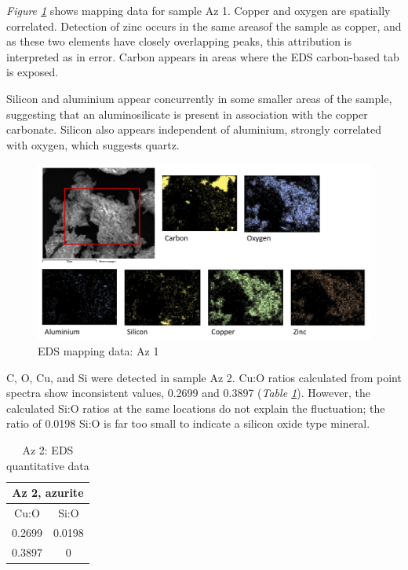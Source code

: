 \textit{Figure \ref{fig:az1_map1}} shows mapping data for sample Az 1. Copper and oxygen are spatially correlated. Detection of zinc occurs in the same areasof the sample as copper, and as these two elements have closely overlapping peaks, this attribution is interpreted as in error. Carbon appears in areas where the EDS carbon-based tab is exposed.

Silicon and aluminium appear concurrently in some smaller areas of the sample, suggesting that an aluminosilicate is present in association with the copper carbonate. Silicon also appears independent of aluminium, strongly correlated with oxygen, which suggests quartz. 

\begin{figure}[H]
\centering
  \includegraphics[width=0.9\linewidth]{Az1_EDS_map2_250221_img}
\caption[EDS mapping data: Az 1]{EDS mapping data: Az 1}
\label{fig:az1_map1}
\end{figure}



C, O, Cu, and Si were detected in sample Az 2. Cu:O ratios calculated from point spectra show inconsistent values, 0.2699 and 0.3897 (\textit{Table \ref{table:az2_ratios}}). However, the calculated Si:O ratios at the same locations do not explain the fluctuation; the ratio of 0.0198 Si:O is far too small to indicate a silicon oxide type mineral.

\begin{table}[H]
\caption{Az 2: EDS quantitative data}
\centering
\label{table:az2_ratios}
\begin{tabular}{c c}
\toprule
\multicolumn{2}{c}{Az 2, azurite} \\
\midrule
Cu:O & Si:O \\
\midrule
0.2699 & 0.0198 \\
0.3897 & 0 \\
\bottomrule
\end{tabular}
\end{table}

